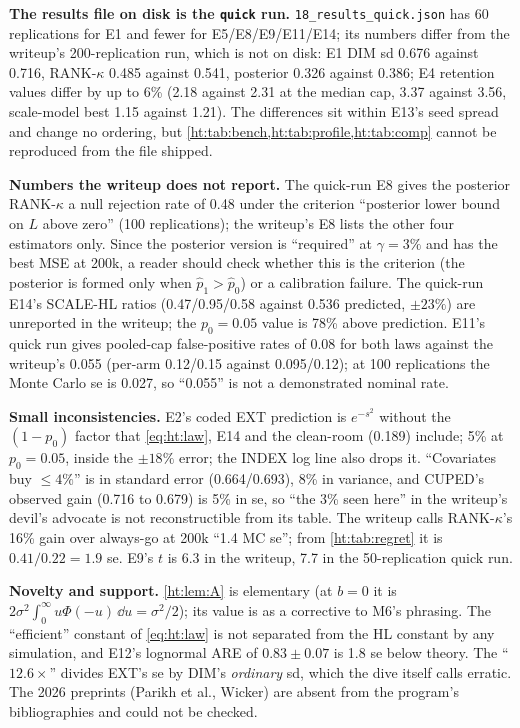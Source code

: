 \begin{reviewernote}[(compiler)]
\textbf{The results file on disk is the \texttt{quick} run.} \texttt{18\_results\_quick.json} has 60 replications for E1 and fewer for E5/E8/E9/E11/E14; its numbers differ from the writeup's 200-replication run, which is not on disk: E1 DIM sd 0.676 against 0.716, RANK-$\kappa$ 0.485 against 0.541, posterior 0.326 against 0.386; E4 retention values differ by up to 6\% (2.18 against 2.31 at the median cap, 3.37 against 3.56, scale-model best 1.15 against 1.21). The differences sit within E13's seed spread and change no ordering, but \cref{ht:tab:bench,ht:tab:profile,ht:tab:comp} cannot be reproduced from the file shipped.

\textbf{Numbers the writeup does not report.} The quick-run E8 gives the posterior RANK-$\kappa$ a null rejection rate of 0.48 under the criterion ``posterior lower bound on $L$ above zero'' (100 replications); the writeup's E8 lists the other four estimators only. Since the posterior version is ``required'' at $\gamma = 3\%$ and has the best MSE at 200k, a reader should check whether this is the criterion (the posterior is formed only when $\hat p_1 > \hat p_0$) or a calibration failure. The quick-run E14's SCALE-HL ratios (0.47/0.95/0.58 against 0.536 predicted, $\pm23\%$) are unreported in the writeup; the $p_0 = 0.05$ value is 78\% above prediction. E11's quick run gives pooled-cap false-positive rates of 0.08 for both laws against the writeup's 0.055 (per-arm 0.12/0.15 against 0.095/0.12); at 100 replications the Monte Carlo se is 0.027, so ``0.055'' is not a demonstrated nominal rate.

\textbf{Small inconsistencies.} E2's coded EXT prediction is $e^{-s^2}$ without the $(1 - p_0)$ factor that \cref{eq:ht:law}, E14 and the clean-room (0.189) include; 5\% at $p_0 = 0.05$, inside the $\pm18\%$ error; the INDEX log line also drops it. ``Covariates buy $\le 4\%$'' is in standard error (0.664/0.693), 8\% in variance, and CUPED's observed gain (0.716 to 0.679) is 5\% in se, so ``the 3\% seen here'' in the writeup's devil's advocate is not reconstructible from its table. The writeup calls RANK-$\kappa$'s 16\% gain over always-go at 200k ``1.4 MC se''; from \cref{ht:tab:regret} it is $0.41/0.22 = 1.9$ se. E9's $t$ is 6.3 in the writeup, 7.7 in the 50-replication quick run.

\textbf{Novelty and support.} \cref{ht:lem:A} is elementary (at $b = 0$ it is $2\sigma^2\int_0^\infty u\Phi(-u)\,\dd u = \sigma^2/2$); its value is as a corrective to M6's phrasing. The ``efficient'' constant of \cref{eq:ht:law} is not separated from the HL constant by any simulation, and E12's lognormal ARE of $0.83 \pm 0.07$ is 1.8 se below theory. The ``$12.6\times$'' divides EXT's se by DIM's \emph{ordinary} sd, which the dive itself calls erratic. The 2026 preprints (Parikh et al., Wicker) are absent from the program's bibliographies and could not be checked.


\end{reviewernote}
